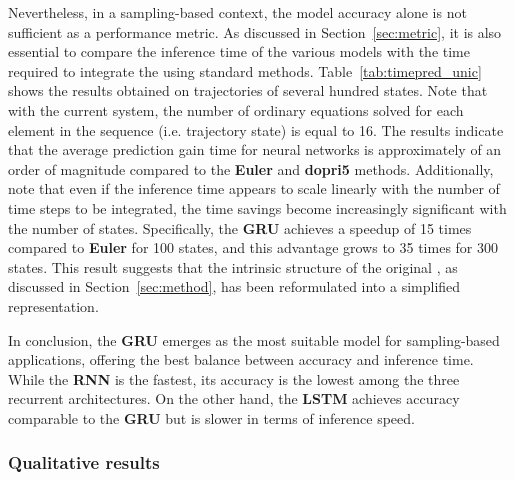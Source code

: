 Nevertheless, in a sampling-based context, the model accuracy alone is not sufficient as a performance metric.
As discussed in Section~\ref{sec:metric}, it is also essential to compare the inference time of the various models with the time required to integrate the  using standard methods.
Table~\ref{tab:timepred_unic} shows the results obtained on trajectories of several hundred states. 
Note that with the current system, the number of ordinary equations solved for each element in the sequence (i.e. trajectory state) is equal to 16.
The results indicate that the average prediction gain time for neural networks is approximately of an order of magnitude compared to the \textbf{Euler} and \textbf{dopri5} methods. 
Additionally, note that even if the inference time appears to scale linearly with the number of time steps to be integrated, the time savings become increasingly significant with the number of states. 
Specifically, the \textbf{GRU} achieves a speedup of 15 times compared to \textbf{Euler} for 100 states, and this advantage grows to 35 times for 300 states.
This result suggests that the intrinsic structure of the original , as discussed in Section~\ref{sec:method}, has been reformulated into a simplified representation.

In conclusion, the \textbf{GRU} emerges as the most suitable model for sampling-based applications, offering the best balance between accuracy and inference time. 
While the \textbf{RNN} is the fastest, its accuracy is the lowest among the three recurrent architectures. 
On the other hand, the \textbf{LSTM} achieves accuracy comparable to the \textbf{GRU} but is slower in terms of inference speed.



\subsubsection{Qualitative results}

